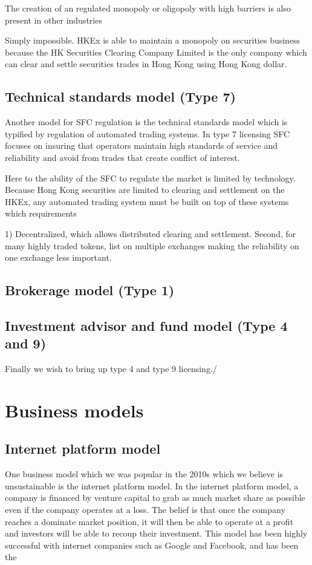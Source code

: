 The creation of an regulated monopoly or oligopoly with high barriers
is also present in other industries

Simply impossible.  HKEx is able to maintain a monopoly on securities
business because the HK Securities Clearing Company Limited is the
only company which can clear and settle securities trades in Hong Kong
using Hong Kong dollar.  


\subsection{Technical standards model (Type 7)}

Another model for SFC regulation is the technical standards model
which is typified by regulation of automated trading systems.  In type
7 licensing SFC focuses on insuring that operators maintain high
standards of service and reliability and avoid from trades that create
conflict of interest.

Here to the ability of the SFC to regulate the market is limited by
technology.  Because Hong Kong securities are limited to clearing and
settlement on the HKEx, any automated trading system must be built on
top of these systems which requirements

1) Decentralized, which allows distributed clearing and settlement.
Second, for many highly traded tokens, list on multiple exchanges
making the reliability on one exchange less important.

\subsection{Brokerage model (Type 1)}



\subsection{Investment advisor and fund model (Type 4 and 9)}
Finally we wish to bring up type 4 and type 9 licensing./


\section{Business models}

\subsection{Internet platform model}

One business model which we was popular in the 2010s which we believe
is unsustainable is the internet platform model.  In the internet
platform model, a company is financed by venture capital to grab as
much market share as possible even if the company operates at a loss.
The belief is that once the company reaches a dominate market
position, it will then be able to operate at a profit and investors
will be able to recoup their investment.  This model has been highly
successful with internet companies such as Google and Facebook, and
has been the 



